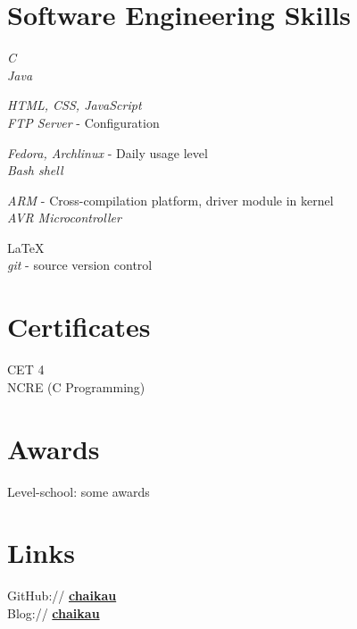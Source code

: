 \documentclass[10pt]{article} %
\begin{document}
\section{Software Engineering Skills}

{
\textit{C}\\
\textit{Java}
}


{
\textit{HTML, CSS, JavaScript}\\
\textit{FTP Server} - Configuration
}


{
\textit{Fedora, Archlinux} - Daily usage level\\
\textit{Bash shell}
}

{
\textit{ARM} - Cross-compilation platform, driver module in kernel\\
\textit{AVR Microcontroller}
}

{
\LaTeX\\
\textit{git} - source version control
}

\section{Certificates}
CET 4 \\
NCRE (C Programming) 

\section{Awards}
Level-school: {\song some awards}


\section{Links}
GitHub:// \href{https://github.com/chaikau}{\bf chaikau}\\
Blog:// \href{http://my.oschina.net/chaiko/blog}{\bf chaikau}

\end{document}

